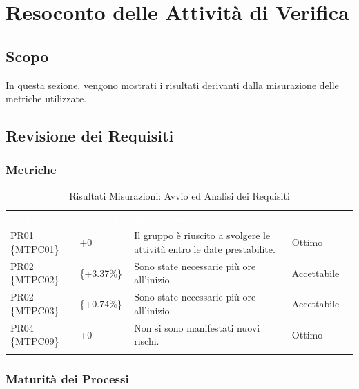 \section{Resoconto delle Attività di Verifica}

\label{Resoconto}
\subsection{Scopo}

In questa sezione, vengono mostrati i risultati derivanti dalla misurazione delle metriche utilizzate.

\subsection{Revisione dei Requisiti}


\subsubsection{Metriche}

\begin{longtable}{|C{.16\textwidth}|C{.16\textwidth}|C{.36\textwidth}|C{.20\textwidth}|}
\hline
{}\textbf{\textcolor{white}{Processo}} & \textbf{\textcolor{white}{Risultato}} & \textbf{\textcolor{white}{Descrizione}} & \textbf{\textcolor{white}{Valutazione}}\\
PR01 \{MTPC01\} & +0 & Il gruppo è riuscito a svolgere le attività entro le date prestabilite. & Ottimo \\
\hline

PR02 \{MTPC02\} &  \{+3.37\%\} & Sono state necessarie più ore all'inizio. & Accettabile\\
\hline

PR02 \{MTPC03\} &  \{+0.74\%\} & Sono state necessarie più ore all'inizio. & Accettabile\\
\hline

PR04 \{MTPC09\} & +0 & Non si sono manifestati nuovi rischi. & Ottimo\\
\hline

\caption{Risultati Misurazioni: Avvio ed Analisi dei Requisiti}
\label{ris:aar}
\end{longtable}

\subsubsection{Maturità dei Processi}

